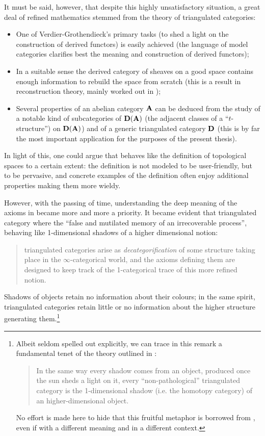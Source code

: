 It must be said, however, that despite this highly unsatisfactory situation, a great deal of refined mathematics stemmed from the theory of triangulated categories:
\begin{itemize}
\item One of Verdier\hyp{}Grothendieck's primary tasks (to shed a light on the construction of derived functors) is easily achieved (the language of model categories clarifies best the meaning and construction of derived functors);
\item In a suitable sense the derived category of sheaves on a good space contains enough information to rebuild the space from scratch (this is a result in reconstruction theory, mainly worked out in \cite{bondal2001reconstruction});
\item {} Several properties of an abelian category $\mathbf{A}$ can be deduced from the study of a notable kind of subcategories of $\mathbf{D}(\mathbf{A})$ (the adjacent classes of a ``$t$\hyp{}structure'') on $\mathbf{D}(\mathbf{A})$) and of a generic triangulated category $\mathbf{D}$ (this is by far the most important application for the purposes of the present thesis).
\end{itemize}
In light of this, one could argue that \adef {} behaves like the definition of topological spaces to a certain extent: the definition is not modeled to be user\hyp{}friendly, but to be pervasive, and concrete examples of the definition often enjoy additional properties making them more wieldy.

However, with the passing of time, understanding the deep meaning of the axioms in \adef {} became more and more a priority. It became evident that triangulated category where the ``false and mutilated memory of an irrecoverable process'', behaving like 1\hyp{}dimensional shadows of a higher dimensional notion: 
\begin{quote}
triangulated categories arise as \emph{decategorification} of some structure taking place in the $\infty$\hyp{}categorical world, and the axioms defining them are designed to keep track of the 1\hyp{}categorical trace of this more refined notion.
\end{quote}
Shadows of objects retain no information about their colours; in the same spirit, triangulated categories retain little or no information about the higher structure generating them.\footnote{Albeit seldom spelled out explicitly, we can trace in this remark a fundamental tenet of the theory outlined in \cite{LurieHA}:
\begin{quote}
In the same way every shadow comes from an object, produced once the sun sheds a light on it, every ``non\hyp{}pathological'' triangulated category is the 1\hyp{}dimensional shadow (i.e. the homotopy category) of an higher\hyp{}dimensional object.
\end{quote}
No effort is made here to hide that this fruitful metaphor is borrowed from \cite{Olivia}, even if with a different meaning and in a different context.}

